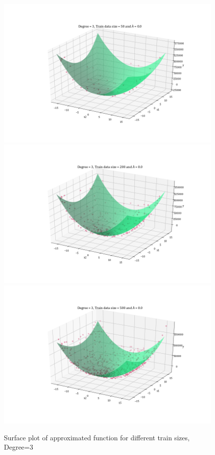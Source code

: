\documentclass[12pt,a4paper]{article}
\begin{document}
\begin{figure}[H]
    \centering
    \includegraphics[scale=0.35]{images/D=3,T=50,l=0.0.png}
    \includegraphics[scale=0.35]{images/D=3,T=200,l=0.0.png}
    \includegraphics[scale=0.35]{images/D=3,T=500,l=0.0.png}
    \caption{Surface plot of approximated function for different train sizes, Degree=3}
    \label{fig:sp_d3}
\end{figure}
\end{document}
